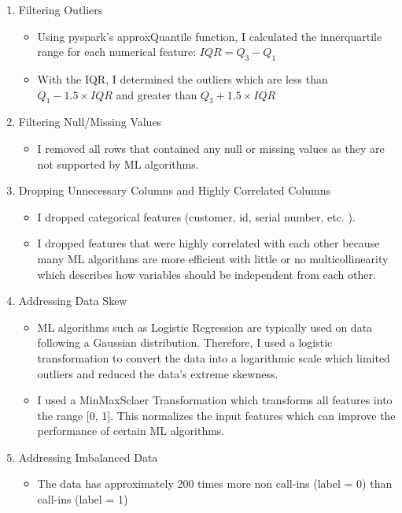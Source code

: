 \documentclass{article}
\begin{document}
\begin{enumerate}
    \item Filtering Outliers
        \begin{itemize}
            \item Using pyspark's approxQuantile function, I calculated the innerquartile range for each numerical feature: $IQR = Q_3 - Q_1$
            \item With the IQR, I determined the outliers which are less than $Q_1 - 1.5 \times IQR$ and greater than $Q_3 + 1.5 \times IQR$
        \end{itemize}
    \item Filtering Null/Missing Values
        \begin{itemize}
            \item I removed all rows that contained any null or missing values as they are not supported by ML algorithms.
        \end{itemize}
    \item Dropping Unnecessary Columns and Highly Correlated Columns
        \begin{itemize}
            \item I dropped categorical features (customer, id, serial number, etc. ).
            \item I dropped features that were highly correlated with each other because many ML algorithms are more efficient with little or no multicollinearity which describes how variables should be independent from each other.
        \end{itemize}
    \item Addressing Data Skew
        \begin{itemize}
            \item ML algorithms such as Logistic Regression are typically used on data following a Gaussian distribution. Therefore, I used a logistic transformation to convert the data into a logarithmic scale which limited outliers and reduced the data's extreme skewness.
            \item I used a MinMaxSclaer Transformation which transforms all features into the range [0, 1]. This normalizes the input features which can improve the performance of certain ML algorithms.
        \end{itemize}
    \item Addressing Imbalanced Data
        \begin{itemize}
            \item The data has approximately 200 times more non call-ins (label = 0) than call-ins (label = 1)

\end{itemize}
\end{enumerate}
\end{document}
